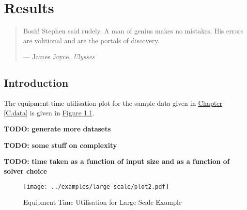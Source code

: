 %
%
%
%

\chapter{Results}\label{C.results}

\begin{quote}
Bosh! Stephen said rudely.
A man of genius makes no mistakes.
His errors are volitional and are the portals of discovery.

\hspace{2cm}--- James Joyce, \emph{Ulysses}
\end{quote}

\section{Introduction}\label{S.intro5}

The equipment time utilisation plot for the sample data given in 
\hyperref[C.data]{Chapter \ref*{C.data}} is given in
\hyperref[fig.etu]{Figure \ref*{fig.etu}}.

\textbf{TODO: generate more datasets}

\textbf{TODO: some stuff on complexity}

\textbf{TODO: time taken as a function of input size and as a function of 
    solver choice}

\newpage
\begin{figure}
    \centering
    \texttt{[image: ../examples/large-scale/plot2.pdf]}
    \caption{Equipment Time Utilisation for Large-Scale Example}
    \label{fig.etu}
\end{figure}
